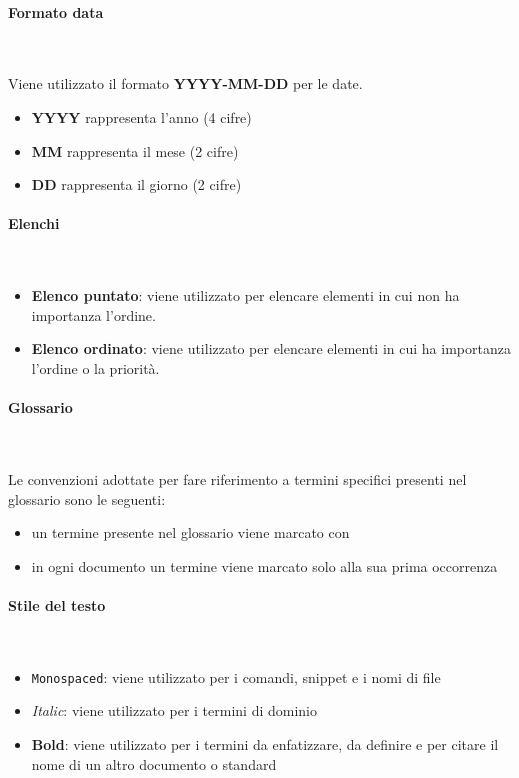         \paragraph{Formato data} ~

         Viene utilizzato il formato \textbf{YYYY-MM-DD} per le date.
            \begin{itemize}
                \item \textbf{YYYY} rappresenta l'anno (4 cifre)
                \item \textbf{MM} rappresenta il mese (2 cifre)
                \item \textbf{DD} rappresenta il giorno (2 cifre)
            \end{itemize}

        \paragraph{Elenchi} ~

        \begin{itemize}
            \item \textbf{Elenco puntato}: viene utilizzato per elencare elementi in cui non ha importanza l'ordine.
            \item \textbf{Elenco ordinato}: viene utilizzato per elencare elementi in cui ha importanza l'ordine o la priorità.
        \end{itemize}

        \paragraph{Glossario} ~

         Le convenzioni adottate per fare riferimento a termini specifici presenti nel glossario sono le seguenti:
            \begin{itemize}
                \item un termine presente nel glossario viene marcato con \glo
                \item in ogni documento un termine viene marcato solo alla sua prima occorrenza
            \end{itemize}

        \paragraph{Stile del testo} ~

        \begin{itemize}
            \item \texttt{Monospaced}: viene utilizzato per i comandi, snippet e i nomi di file
            \item \textit{Italic}: viene utilizzato per i termini di dominio
            \item \textbf{Bold}: viene utilizzato per i termini da enfatizzare, da definire e per citare il nome di un altro documento o standard
        \end{itemize}

